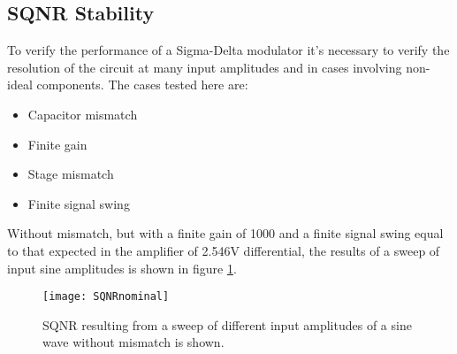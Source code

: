 %
%

    \subsection{SQNR Stability}
    To verify the performance of a Sigma-Delta modulator it's necessary to verify the resolution of the circuit at many input amplitudes and in cases involving non-ideal components.
    The cases tested here are:
    \begin{itemize}
        \item Capacitor mismatch
        \item Finite gain
        \item Stage mismatch
        \item Finite signal swing
    \end{itemize}

    Without mismatch, but with a finite gain of 1000 and a finite signal swing equal to that expected in the amplifier of 2.546V differential, the results of a sweep of input sine amplitudes is shown in figure \ref{fig:SQNRnominal}.

    \begin{figure}
        \begin{center}
        \texttt{[image: SQNRnominal]}
        \label{fig:SQNRnominal}
        \caption{SQNR resulting from a sweep of different input amplitudes of a sine wave without mismatch is shown.}
        \end{center}
    \end{figure}  




